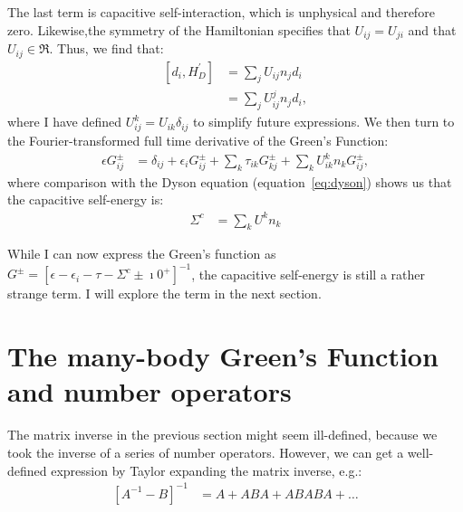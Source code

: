 The last term is capacitive self-interaction, which is unphysical and therefore zero. Likewise,the symmetry of the Hamiltonian specifies that $U_{ij} = U_{ji}$ and that $U_{ij} \in \Re$. Thus, we find that:
\begin{align*}
\left[ d_i, H^\prime_D\right] &=  \sum_{j}U_{ij} n_j d_i \\
&= \sum_j U^j_{ij} n_j d_i,
\end{align*}
where I have defined $U^k_{ij} = U_{ik} \delta_{ij}$ to simplify future expressions. We then turn to the Fourier-transformed full time derivative of the Green's Function:
\begin{align*}
\epsilon G_{ij}^\pm &= \delta_{ij} + \epsilon_i G_{ij}^\pm + \sum_k \tau_{ik} G_{kj}^\pm + \sum_k U^k_{ik} n_k G_{ij}^\pm,
\end{align*}
where comparison with the Dyson equation (equation~\ref{eq:dyson}) shows us that the capacitive self-energy is:
\begin{align}
\Sigma^{c} &= \sum_k U^k n_k
\label{eq:selfenergycapacitive}
\end{align}

While I can now express the Green's function as $G^\pm = \left[ \epsilon - \epsilon_i - \tau - \Sigma^c \pm \imath 0^+\right]^{-1}$, the capacitive self-energy is still a rather strange term. I will explore the term in the next section.

\section{The many-body Green's Function and number operators}
\label{sec:mbgfno}
The matrix inverse in the previous section might seem ill-defined, because we took the inverse of a series of number operators. However, we can get a well-defined expression by Taylor expanding the matrix inverse, e.g.:
\begin{align}
\left[ A^{-1} - B\right]^{-1} &= A + ABA + ABABA + \ldots
\label{eq:inversionexpansion}
\end{align}

